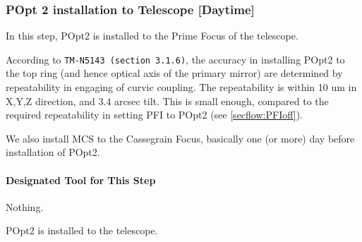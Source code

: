 \subsubsection{POpt 2 installation to Telescope [Daytime]}\label{secflow:PFIinstall}
In this step,  POpt2 is installed to the Prime Focus of the telescope.

According to {\tt TM-N5143 (section 3.1.6)}, the accuracy in installing POpt2 to the top ring (and hence optical axis of the primary mirror) are determined by repeatability in engaging of curvic coupling.
The repeatability is within 10 um in X,Y,Z direction, and 3.4 arcsec tilt.
This is small enough, compared to the required repeatability in setting PFI to POpt2 (see \ref{secflow:PFIoff}).

We also install MCS to the Cassegrain Focus, basically one (or more) day before installation of POpt2.

\paragraph{Designated Tool for This Step}
Nothing.

\begin{itembox}[l]{}
POpt2 is installed to the telescope. 

\end{itembox}